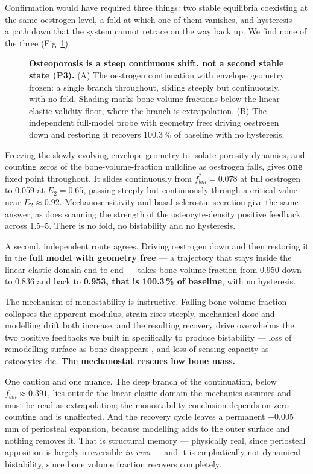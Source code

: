\documentclass[10pt,letterpaper]{article}
\begin{document}
Confirmation would have required three things: two stable equilibria
coexisting at the same oestrogen level, a fold at which one of them
vanishes, and hysteresis --- a path down that the system cannot retrace on
the way back up. We find none of the three (Fig~\ref{fig7}).

\begin{figure}[!h]
\caption{{\bf Osteoporosis is a steep continuous shift, not a second stable
state (P3).}
(A) The oestrogen continuation with envelope geometry frozen: a single branch
throughout, sliding steeply but continuously, with no fold. Shading marks bone
volume fractions below the linear-elastic validity floor, where the branch is
extrapolation. (B) The independent full-model probe with geometry free:
driving oestrogen down and restoring it recovers 100.3\,\% of baseline with no
hysteresis.}
\label{fig7}
\end{figure}

Freezing the slowly-evolving envelope geometry to isolate porosity dynamics,
and counting zeros of the bone-volume-fraction nullcline as oestrogen falls,
gives \textbf{one} fixed point throughout. It slides continuously from
$f_{bm}^* = 0.078$ at full oestrogen to 0.059 at $E_2 = 0.65$, passing steeply
but continuously through a critical value near $E_2 \approx 0.92$.
Mechanosensitivity and basal sclerostin secretion give the same answer, as
does scanning the strength of the osteocyte-density positive feedback across
1.5--5. There is no fold, no bistability and no hysteresis.

A second, independent route agrees. Driving oestrogen down and then restoring
it in the \textbf{full model with geometry free} --- a trajectory that stays
inside the linear-elastic domain end to end --- takes bone volume fraction
from 0.950 down to 0.836 and back to \textbf{0.953, that is 100.3\,\% of
baseline}, with no hysteresis.

The mechanism of monostability is instructive. Falling bone volume fraction
collapses the apparent modulus, strain rises steeply, mechanical dose and
modelling drift both increase, and the resulting recovery drive overwhelms the
two positive feedbacks we built in specifically to produce bistability --- loss
of remodelling surface as bone disappears \cite{martin1984}, and loss of
sensing capacity as osteocytes die. \textbf{The mechanostat rescues low bone
mass.}

One caution and one nuance. The deep branch of the continuation, below
$f_{bm} \approx 0.391$, lies outside the linear-elastic domain the mechanics
assumes \cite{bayraktar2004} and must be read as extrapolation; the
monostability conclusion depends on zero-counting and is unaffected. And the
recovery cycle leaves a permanent $+0.005$\,mm of periosteal expansion,
because modelling adds to the outer surface and nothing removes it. That is
structural memory --- physically real, since periosteal apposition is largely
irreversible \emph{in vivo} --- and it is emphatically not dynamical
bistability, since bone volume fraction recovers completely.
\end{document}
